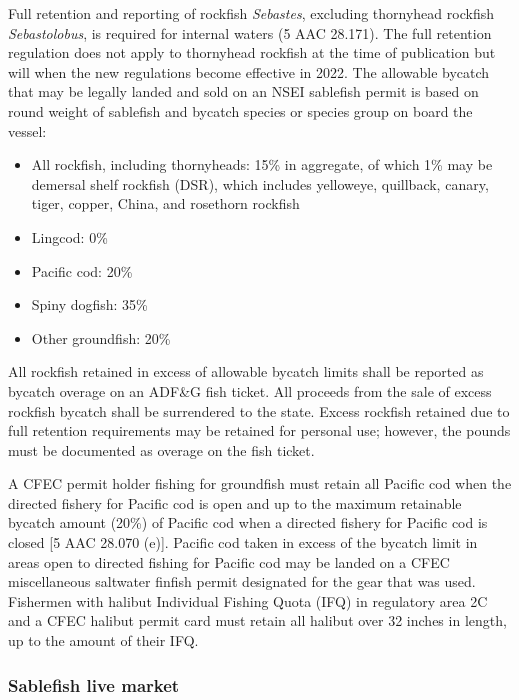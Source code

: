 \documentclass[
]{article}
\providecommand{\tightlist}{%
  \setlength{\itemsep}{0pt}\setlength{\parskip}{0pt}}
\begin{document}
Full retention and reporting of rockfish \emph{Sebastes}, excluding thornyhead rockfish \emph{Sebastolobus}, is required for internal waters (5 AAC 28.171). The full retention regulation does not apply to thornyhead rockfish at the time of publication but will when the new regulations become effective in 2022. The allowable bycatch that may be legally landed and sold on an NSEI sablefish permit is based on round weight of sablefish and bycatch species or species group on board the vessel:

\begin{itemize}
\tightlist
\item
  All rockfish, including thornyheads: 15\% in aggregate, of which 1\% may be demersal shelf rockfish (DSR), which includes yelloweye, quillback, canary, tiger, copper, China, and rosethorn rockfish
\item
  Lingcod: 0\%
\item
  Pacific cod: 20\%
\item
  Spiny dogfish: 35\%
\item
  Other groundfish: 20\%
\end{itemize}

All rockfish retained in excess of allowable bycatch limits shall be reported as bycatch overage on an ADF\&G fish ticket. All proceeds from the sale of excess rockfish bycatch shall be surrendered to the state. Excess rockfish retained due to full retention requirements may be retained for personal use; however, the pounds must be documented as overage on the fish ticket.

A CFEC permit holder fishing for groundfish must retain all Pacific cod when the directed fishery for Pacific cod is open and up to the maximum retainable bycatch amount (20\%) of Pacific cod when a directed fishery for Pacific cod is closed {[}5 AAC 28.070 (e){]}. Pacific cod taken in excess of the bycatch limit in areas open to directed fishing for Pacific cod may be landed on a CFEC miscellaneous saltwater finfish permit designated for the gear that was used. Fishermen with halibut Individual Fishing Quota (IFQ) in regulatory area 2C and a CFEC halibut permit card must retain all halibut over 32 inches in length, up to the amount of their IFQ.

\hypertarget{sablefish-live-market}{%
\subsubsection{Sablefish live market}\label{sablefish-live-market}}
\end{document}
